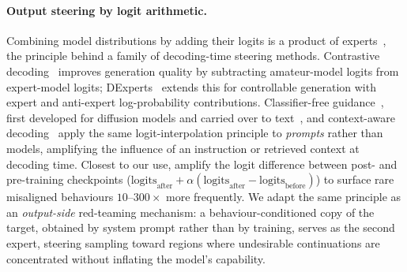 \paragraph{Output steering by logit arithmetic.}
Combining model distributions by adding their logits is a product of experts~\citep{hinton2002poe}, the principle behind a family of decoding-time steering methods.
Contrastive decoding~\citep{li2023contrastive} improves generation quality by subtracting amateur-model logits from expert-model logits; DExperts~\citep{liu2021dexperts} extends this for controllable generation with expert and anti-expert log-probability contributions.
Classifier-free guidance~\citep{ho2022cfg}, first developed for diffusion models and carried over to text~\citep{sanchez2023cfg}, and context-aware decoding~\citep{shi2024trusting} apply the same logit-interpolation principle to \emph{prompts} rather than models, amplifying the influence of an instruction or retrieved context at decoding time.
Closest to our use, \citet{aranguri2025diffamp} amplify the logit difference between post- and pre-training checkpoints ($\text{logits}_{\text{after}} + \alpha(\text{logits}_{\text{after}} - \text{logits}_{\text{before}})$) to surface rare misaligned behaviours $10$--$300\times$ more frequently.
We adapt the same principle as an \emph{output-side} red-teaming mechanism: a behaviour-conditioned copy of the target, obtained by system prompt rather than by training, serves as the second expert, steering sampling toward regions where undesirable continuations are concentrated without inflating the model's capability.


